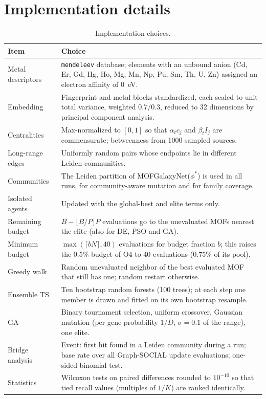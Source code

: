 \documentclass[journal=jcisd8,manuscript=suppinfo]{achemso}
\newcommand{\gs}{Graph-SOCIAL}
\begin{document}
\section{Implementation details}

\begin{table}[h]
\caption{Implementation choices.}
\label{tab:impl}
\footnotesize
\begin{tabular}{@{}p{3.3cm}p{11.2cm}@{}}
\toprule
Item & Choice \\
\midrule
Metal descriptors & \texttt{mendeleev} database; elements with an unbound anion (Cd, Er, Gd, Hg, Ho, Mg, Mn, Np, Pu, Sm, Th, U, Zn) assigned an electron affinity of 0~eV. \\
Embedding & Fingerprint and metal blocks standardized, each scaled to unit total variance, weighted 0.7/0.3, reduced to 32 dimensions by principal component analysis. \\
Centralities & Max-normalized to $[0,1]$ so that $\alpha_tc_j$ and $\beta_tI_j$ are commensurate; betweenness from 1000 sampled sources. \\
Long-range edges & Uniformly random pairs whose endpoints lie in different Leiden communities. \\
Communities & The Leiden partition of MOFGalaxyNet($\phi^\ast$) is used in all runs, for community-aware mutation and for family coverage. \\
Isolated agents & Updated with the global-best and elite terms only. \\
Remaining budget & $B-\lfloor B/P\rfloor P$ evaluations go to the unevaluated MOFs nearest the elite (also for DE, PSO and GA). \\
Minimum budget & $\max(\lceil bN\rceil,40)$ evaluations for budget fraction $b$; this raises the 0.5\% budget of O4 to 40 evaluations (0.75\% of its pool). \\
Greedy walk & Random unevaluated neighbor of the best evaluated MOF that still has one; random restart otherwise. \\
Ensemble TS & Ten bootstrap random forests (100 trees); at each step one member is drawn and fitted on its own bootstrap resample. \\
GA & Binary tournament selection, uniform crossover, Gaussian mutation (per-gene probability $1/D$, $\sigma=0.1$ of the range), one elite. \\
Bridge analysis & Event: first hit found in a Leiden community during a run; base rate over all \gs{} update evaluations; one-sided binomial test. \\
Statistics & Wilcoxon tests on paired differences rounded to $10^{-10}$ so that tied recall values (multiples of $1/K$) are ranked identically. \\
\bottomrule
\end{tabular}
\end{table}
\end{document}
